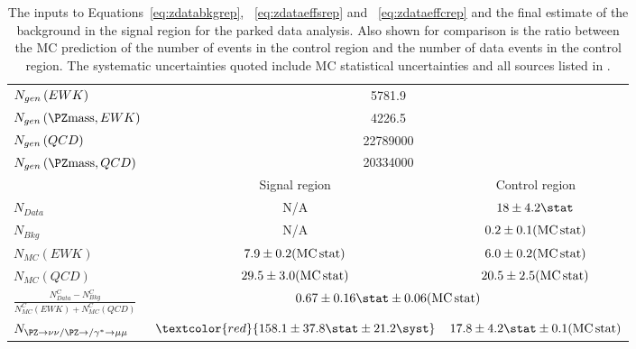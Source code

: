 \begin{table}
  \caption{The inputs to Equations~\ref{eq:zdatabkgrep}, ~\ref{eq:zdataeffsrep} and ~\ref{eq:zdataeffcrep} and the final estimate of the \Znunu background in the signal region for the parked data analysis. Also shown for comparison is the ratio between the \ac{MC} prediction of the number of \Zmumu events in the control region and the number of data events in the control region. The systematic uncertainties quoted include MC statistical uncertainties and all sources listed in . }
  \label{tab:parkedznunu}
  \begin{tabular}{lcc}
    \hline
    \hline
    $N_{gen}\left(\mathnormal{EWK}\right)$&\multicolumn{2}{c}{5781.9}\\
    $N_{gen}\left(\PZ\rm{mass},\mathnormal{EWK}\right)$&\multicolumn{2}{c}{4226.5}\\
    $N_{gen}\left(\mathnormal{QCD}\right)$&\multicolumn{2}{c}{22789000}\\
    $N_{gen}\left(\PZ\rm{mass},\mathnormal{QCD}\right)$&\multicolumn{2}{c}{20334000}\\
    \hline
    \hline
    & Signal region & Control region \\
    \hline
    \hline
    $N_{Data}$ & N/A & $18\pm 4.2\stat$ \\
    $N_{Bkg}$ & N/A & $0.2\pm 0.1 (\rm{MC\,stat})$ \\
    $N_{MC}\left(EWK\right)$ & $7.9\pm 0.2 (\rm{MC\,stat})$& $6.0\pm 0.2 (\rm{MC\,stat})$ \\
    $N_{MC}\left(QCD\right)$ & $29.5\pm 3.0 (\rm{MC\,stat})$ & $20.5\pm 2.5 (\rm{MC\,stat})$ \\
    \hline
    $\frac{N^{C}_{Data}-N^{C}_{Bkg}}{N^{C}_{MC}\left(EWK\right)+N^{C}_{MC}\left(QCD\right)}$ & \multicolumn{2}{c}{$0.67\pm 0.16\stat\pm 0.06 (\rm{MC\,stat})$} \\
    \hline
    $N_{\PZ\rightarrow \nu\nu/\PZ\rightarrow/\gamma^{*}\rightarrow\mu\mu}$ & $\textcolor{red}{158.1\pm 37.8\stat\pm 21.2\syst}$ & $17.8\pm 4.2\stat\pm 0.1 (\rm{MC\,stat})$ \\
    \hline
    \hline
  \end{tabular}
\end{table}

